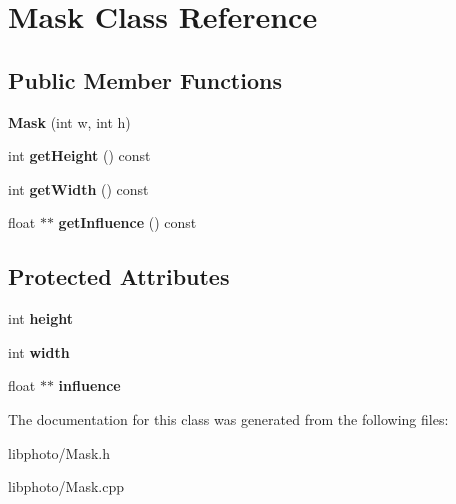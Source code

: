 \hypertarget{classMask}{\section{Mask Class Reference}
\label{classMask}
}
\subsection*{Public Member Functions}
\begin{DoxyCompactItemize}
\item 
\hypertarget{classMask_a1fdc1ca0927f8f6b792cc3130087f933}{{\bfseries Mask} (int w, int h)}\label{classMask_a1fdc1ca0927f8f6b792cc3130087f933}

\item 
\hypertarget{classMask_a38d79e2785ddb9b1684b1183963091af}{int {\bfseries get\-Height} () const }\label{classMask_a38d79e2785ddb9b1684b1183963091af}

\item 
\hypertarget{classMask_a3367b822da66a059ac6f16e79472566f}{int {\bfseries get\-Width} () const }\label{classMask_a3367b822da66a059ac6f16e79472566f}

\item 
\hypertarget{classMask_a5a7cfb7560ca289748040963b64f91ae}{float $\ast$$\ast$ {\bfseries get\-Influence} () const }\label{classMask_a5a7cfb7560ca289748040963b64f91ae}

\end{DoxyCompactItemize}
\subsection*{Protected Attributes}
\begin{DoxyCompactItemize}
\item 
\hypertarget{classMask_ae5fec5d187fb0fc64383badbbd5773d4}{int {\bfseries height}}\label{classMask_ae5fec5d187fb0fc64383badbbd5773d4}

\item 
\hypertarget{classMask_a3bf4b8e804ee6ba93e0e62a71062fa1e}{int {\bfseries width}}\label{classMask_a3bf4b8e804ee6ba93e0e62a71062fa1e}

\item 
\hypertarget{classMask_a0d551850a8c005e17070e31666f0c0d0}{float $\ast$$\ast$ {\bfseries influence}}\label{classMask_a0d551850a8c005e17070e31666f0c0d0}

\end{DoxyCompactItemize}


The documentation for this class was generated from the following files\-:\begin{DoxyCompactItemize}
\item 
libphoto/Mask.\-h\item 
libphoto/Mask.\-cpp\end{DoxyCompactItemize}
